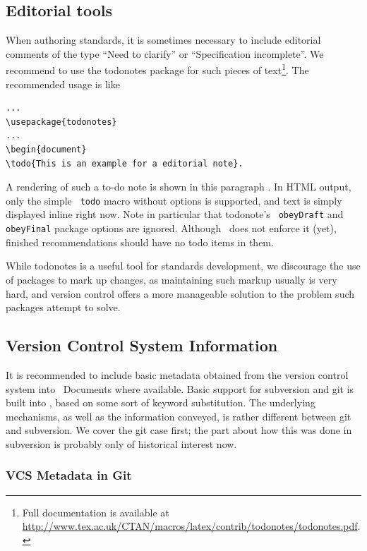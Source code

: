 \documentclass[11pt,a4paper]{ivoa}
\newcommand{\texword}[1]{\texttt{\color{texcolor} #1}}
\begin{document}
\subsection{Editorial tools}

When authoring standards, it is sometimes necessary to include
editorial comments of the type ``Need to clarify'' or ``Specification
incomplete''.  We recommend to use the todonotes package for such
pieces of text\footnote{Full documentation is available at
\url{http://www.tex.ac.uk/CTAN/macros/latex/contrib/todonotes/todonotes.pdf}.}.
The recommended usage is like
\begin{lstlisting}
...
\usepackage{todonotes}
...
\begin{document}
\todo{This is an example for a editorial note}.
\end{lstlisting}

A rendering of such a to-do note is shown in this paragraph
. In HTML output,
only the simple \texword{todo} macro without options is supported, and
text is simply displayed inline right now.  Note in particular that
todonote's \texword{obeyDraft} and \texword{obeyFinal} package options
are ignored.  Although \ivoatex\ does not enforce it (yet), finished
recommendations should have no todo items in them.

While todonotes is a useful tool for standards development, we
discourage the use of packages to mark up changes, as maintaining such
markup usually is very hard, and version control offers a more
manageable solution to the problem such packages attempt to solve.

\subsection{Version Control System Information}
\label{sect:vcs}

It is recommended to include basic metadata obtained from the version
control system into \ivoatex~Documents where available.  Basic support
for subversion and git is built into \ivoatex, based on some sort
of keyword substitution.  The underlying mechanisms, as well as
the information conveyed, is rather different between git and
subversion.  We cover the git case first; the part about how this was
done in subversion is probably only of historical interest now.

\subsubsection{VCS Metadata in Git}
\end{document}
